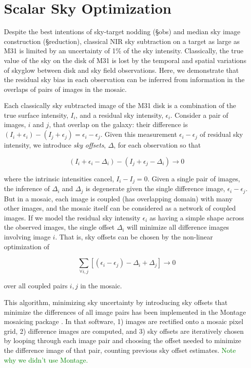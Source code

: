 \documentclass[iop]{emulateapj}
\newcommand{\todo}[1]{\textcolor{green}{#1}}
\begin{document}

\section{Scalar Sky Optimization}

Despite the best intentions of sky-target nodding (\S obs) and median sky image construction (\S reduction), classical NIR sky subtraction on a target as large as M31 is limited by an uncertainty of 1\% of the sky intensity. Classically, the true value of the sky on the disk of M31 is lost by the temporal and spatial variations of skyglow between disk and sky field observations. Here, we demonstrate that the residual sky bias in each observation can be inferred from information in the overlaps of pairs of images in the mosaic.

Each classically sky subtracted image of the M31 disk is a combination of the true surface intensity, $I_i$, and a residual sky intensity, $\epsilon_i$. Consider a pair of images, $i$ and $j$, that overlap on the galaxy: their difference is $(I_i+\epsilon_i) - (I_j+\epsilon_j) = \epsilon_i - \epsilon_j$. Given this measurement $\epsilon_i - \epsilon_j$ of residual sky intensity, we introduce \emph{sky offsets}, $\Delta$, for each observation so that

\begin{equation}
    (I_i + \epsilon_i - \Delta_i) - (I_j + \epsilon_j - \Delta_i) \rightarrow 0
\end{equation}

\noindent where the intrinsic intensities cancel, $I_i - I_j = 0$. Given a single pair of images, the inference of $\Delta_i$ and $\Delta_j$ is degenerate given the single difference image, $\epsilon_i-\epsilon_j$. But in a mosaic, each image is coupled (has overlapping domain) with many other images, and the mosaic itself can be considered as a network of coupled images. If we model the residual sky intensity $\epsilon_i$ as having a simple shape across the observed images, the single offset $\Delta_i$ will minimize all difference images involving image $i$. That is, sky offsets can be chosen by the non-linear optimization of

\begin{equation}
    \sum_{\forall i,j} [(\epsilon_i - \epsilon_j) - \Delta_i + \Delta_j] \rightarrow 0
\end{equation}

\noindent over all coupled pairs $i,j$ in the mosaic.

This algorithm, minimizing sky uncertainty by introducing sky offsets that minimize the differences of all image pairs has been implemented in the Montage mosaicing package
\citep{Berriman:2008}. In that software, 1) images are rectified onto a mosaic pixel grid, 2) difference images are computed, and 3) sky offsets are iteratively chosen by looping through each image pair and choosing the offset needed to minimize the difference image of that pair, counting previous sky offset estimates. \todo{Note why we didn't use Montage.}




\end{document}
